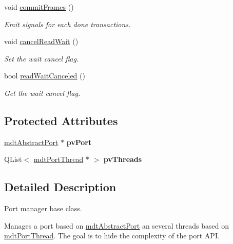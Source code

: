 \begin{DoxyCompactItemize}
void \hyperlink{classmdt_port_manager_a84d37b380080eb26e56c68424dedd958}{commitFrames} ()
\begin{DoxyCompactList}\small\item\em Emit signals for each done transactions. \end{DoxyCompactList}\item 
void \hyperlink{classmdt_port_manager_a016996e823cc729eb1f595307f3dd1cf}{cancelReadWait} ()
\begin{DoxyCompactList}\small\item\em Set the wait cancel flag. \end{DoxyCompactList}\item 
bool \hyperlink{classmdt_port_manager_a83ade128d6e70f7216355e9df840c2a6}{readWaitCanceled} ()
\begin{DoxyCompactList}\small\item\em Get the wait cancel flag. \end{DoxyCompactList}\end{DoxyCompactItemize}
\subsection*{Protected Attributes}
\begin{DoxyCompactItemize}
\item 
\hypertarget{classmdt_port_manager_af856162aab4f1c5202c1dfb330fae538}{
\hyperlink{classmdt_abstract_port}{mdtAbstractPort} $\ast$ {\bfseries pvPort}}
\label{classmdt_port_manager_af856162aab4f1c5202c1dfb330fae538}

\item 
\hypertarget{classmdt_port_manager_a8e0d49b789f8b01d469e84b487799573}{
QList$<$ \hyperlink{classmdt_port_thread}{mdtPortThread} $\ast$ $>$ {\bfseries pvThreads}}
\label{classmdt_port_manager_a8e0d49b789f8b01d469e84b487799573}

\end{DoxyCompactItemize}


\subsection{Detailed Description}
Port manager base class. 

Manages a port based on \hyperlink{classmdt_abstract_port}{mdtAbstractPort} an several threads based on \hyperlink{classmdt_port_thread}{mdtPortThread}. The goal is to hide the complexity of the port API.

